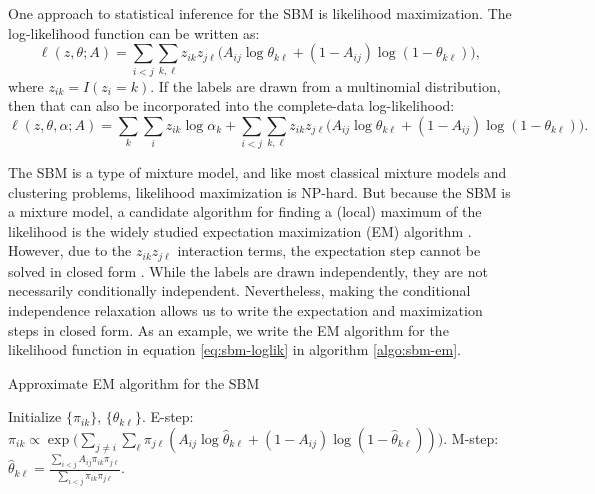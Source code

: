 \documentclass[
  12pt,
]{article}
\theoremstyle{definition}
\theoremstyle{definition}
\theoremstyle{definition}
\theoremstyle{definition}
\theoremstyle{remark}
\begin{document}
One approach to statistical inference for the SBM is likelihood maximization.
The log-likelihood function can be written as:
\begin{equation}
\label{eq:sbm-loglik}
\ell(z, \theta; A) = \sum_{i < j} \sum_{k, \ell} z_{ik} z_{j \ell} \big( 
A_{ij} \log \theta_{k \ell} + (1 - A_{ij}) \log (1 - \theta_{k \ell}) \big),
\end{equation}
where \(z_{ik} = I(z_i = k)\). If the labels are drawn from a multinomial distribution, then that can also be incorporated into the complete-data log-likelihood:
\begin{equation}
\label{eq:sbm-loglik-full}
\ell(z, \theta, \alpha; A) = \sum_k \sum_i z_{ik} \log \alpha_k + 
\sum_{i < j} \sum_{k, \ell} z_{ik} z_{j \ell} \big( 
A_{ij} \log \theta_{k \ell} + (1 - A_{ij}) \log (1 - \theta_{k \ell}) \big).
\end{equation}

The SBM is a type of mixture model, and like most classical mixture models and clustering problems, likelihood maximization is NP-hard.
But because the SBM is a mixture model, a candidate algorithm for finding a (local) maximum of the likelihood is the widely studied expectation maximization (EM) algorithm \citep{10.2307/2984875}.
However, due to the \(z_{ik} z_{j \ell}\) interaction terms, the expectation step cannot be solved in closed form \citep{kolaczyk2014statistical}.
While the labels are drawn independently, they are not necessarily conditionally independent.
Nevertheless, making the conditional independence relaxation allows us to write the expectation and maximization steps in closed form.
As an example, we write the EM algorithm for the likelihood function in equation \eqref{eq:sbm-loglik} in algorithm \ref{algo:sbm-em}.

\begin{algorithm}
  \label{algo:sbm-em}
  \DontPrintSemicolon
  \SetAlgoLined
  \caption{Approximate EM algorithm for the SBM}
  Initialize $\{\pi_{ik}\}$, $\{\theta_{k \ell}\}$.\;
  \While{$\|\nabla \ell\| > \epsilon$} {
     {
       {
      E-step: $\pi_{ik} \propto \exp \bigg( \sum_{j \neq i} \sum_{\ell} \pi_{j \ell} (A_{ij} \log \hat{\theta}_{k \ell} + (1 - A_{ij}) \log (1 - \hat{\theta}_{k \ell})) \bigg)$.\;
         {
          M-step: $\hat{\theta}_{k \ell} = \frac{\sum_{i < j} A_{ij} \pi_{ik} \pi_{j \ell}}{\sum_{i < j} \pi_{ik} \pi_{j \ell}}$.\;
        }
      }
    }
  }
\end{algorithm}
\end{document}
